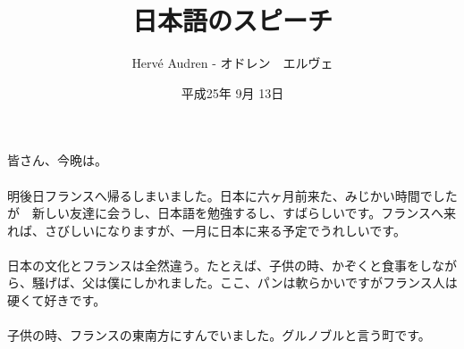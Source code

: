 \documentclass[a4paper,11pt]{article}
\begin{document}
\begin{CJK}{UTF8}{min}
\doublespacing
\author{Herv\'e Audren - オドレン　エルヴェ}
\title{日本語のスピーチ}
\date{平成25年 9月 13日}
\maketitle

\paragraph*{}皆さん、今晩は。
\paragraph*{}明後日フランスへ帰るしまいました。日本に六ヶ月前来た、みじかい時間でしたが　新しい友達に会うし、日本語を勉強するし、すばらしいです。フランスへ来れば、さびしいになりますが、一月に日本に来る予定でうれしいです。

\paragraph*{}日本の文化とフランスは全然違う。たとえば、子供の時、かぞくと食事をしながら、騒げば、父は僕にしかれました。ここ、パンは軟らかいですがフランス人は硬くて好きです。

\paragraph*{}子供の時、フランスの東南方にすんでいました。グルノブルと言う町です。

\end{CJK}
\end{document}
